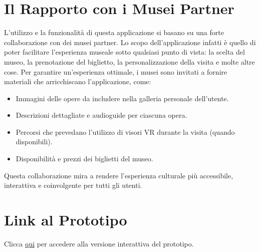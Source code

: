 \documentclass{article}
\begin{document}
\section{Il Rapporto con i Musei Partner}
L’utilizzo e la funzionalità di questa applicazione si basano su una forte collaborazione con dei musei partner. 
Lo scopo dell’applicazione infatti è quello di poter facilitare l’esperienza museale sotto qualsiasi punto di vista: la scelta del museo, la prenotazione del biglietto, la personalizzazione della visita e molte altre cose.
Per garantire un’esperienza ottimale, i musei sono invitati a fornire materiali che arricchiscano l’applicazione, come:
\begin{itemize}
\item Immagini delle opere da includere nella galleria personale dell’utente.
\item Descrizioni dettagliate e audioguide per ciascuna opera.
\item Percorsi che prevedano l’utilizzo di visori VR durante la visita (quando disponibili).
\item Disponibilità e prezzi dei biglietti del museo.
\end{itemize}
Questa collaborazione mira a rendere l’esperienza culturale più accessibile, interattiva e coinvolgente per tutti gli utenti.

\section{Link al Prototipo}

Clicca \href{https://www.figma.com/design/DssxKU75A7I8ykLuzYvFeC/Raffinamento-Prototipo-Mobile-App?node-id=0-1\&t=XWcp3V56G4vdl11N-1}{qui} per accedere alla versione interattiva del prototipo.
\end{document}
